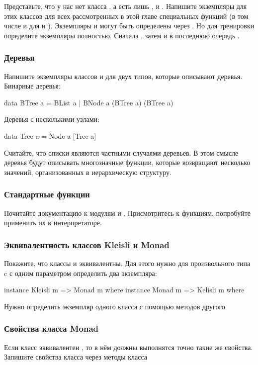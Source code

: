 Представьте, что у нас нет класса , а есть
лишь ,  и . Напишите экземпляры
для этих классов для всех рассмотренных в этой главе
специальных функций (в том числе и для  и ).
Экземпляры  и  могут быть определены
через . Но для тренировки определите экземпляры полностью. 
Сначала , затем  и в последнюю очередь
.

\subsubsection{Деревья}

Напишите экземпляры классов  и 
для двух типов, которые описывают деревья. Бинарные деревья:

\begin{code}
data BTree a = BList a | BNode a (BTree a) (BTree a)
\end{code}

Деревья с несколькими узлами:

\begin{code}
data Tree a = Node a [Tree a]
\end{code}

Считайте, что списки являются частными случаями деревьев.
В этом смысле деревья будут описывать многозначные функции,
которые возвращают несколько значений, организованных 
в иерархическую структуру. 

\subsubsection{Стандартные функции}

Почитайте документацию к модулям 
и . Присмотритесь к функциям, 
попробуйте применить их в интерпретаторе. 

\subsubsection{Эквивалентность классов Kleisli и Monad}

Покажите, что классы  и 
эквивалентны. Для этого нужно для произвольного
типа c с одним параметром  определить два экземпляра: 

\begin{code}
instance Kleisli m => Monad   m where
instance Monad   m => Kelisli m where
\end{code}

Нужно определить экземпляр одного класса с помощью методов другого.

\subsubsection{Свойства класса Monad}

Если класс  эквивалентен ,
то в нём должны выполнятся точно такие же свойства.
Запишите свойства класса  через методы
класса  
